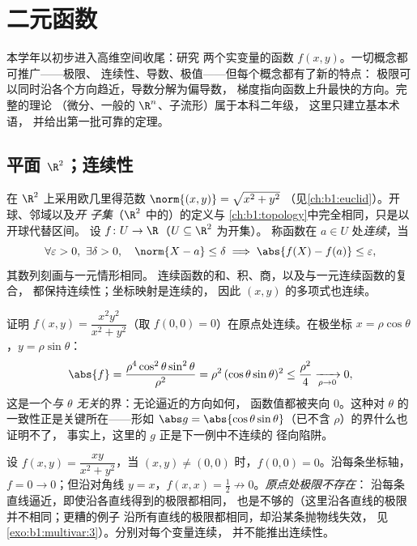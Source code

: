 \chapter{二元函数}\label{ch:b1:multivar}

本学年以初步进入高维空间收尾：研究
两个实变量的函数 $f(x, y)$。一切概念都可推广——极限、
连续性、导数、极值——但每个概念都有了新的特点：
极限可以同时沿各个方向趋近，导数分解为偏导数，
梯度指向函数上升最快的方向。完整的理论
（微分、一般的 $\R^n$、子流形）属于本科二年级，
这里只建立基本术语，
并给出第一批可靠的定理。

\section{平面 $\R^2$；连续性}

\begin{definition}\label{def:b1:multivar:topology}
在 $\R^2$ 上采用欧几里得范数 $\norm{(x,y)} = \sqrt{x^2 + y^2}$
（见\cref{ch:b1:euclid}）。开球、邻域以及\emph{开
子集}（$\R^2$ 中的）的定义与
\cref{ch:b1:topology}中完全相同，只是以开球代替区间。
设 $f \colon U \to \R$（$U \subseteq \R^2$ 为开集）。
称函数在 $a \in U$ 处\emph{连续}，当
\[
\forall\varepsilon > 0,\ \exists\delta > 0, \quad
\norm{X - a} \leq \delta \implies \abs{f(X) - f(a)} \leq
\varepsilon,
\]
其数列刻画与一元情形相同。
连续函数的和、积、商，以及与一元连续函数的复合，
都保持连续性；坐标映射是连续的，
因此 $(x,y)$ 的多项式也连续。
\end{definition}

\begin{example}
\label{ex:b1:multivar:polarbound}
证明 $f(x, y) = \dfrac{x^2y^2}{x^2 + y^2}$（取 $f(0,0) =
0$）在原点处连续。在极坐标 $x =
\rho\cos\theta$，$y = \rho\sin\theta$：
\[
\abs{f} = \frac{\rho^4\cos^2\theta\sin^2\theta}{\rho^2}
= \rho^2\,(\cos\theta\sin\theta)^2 \leq \frac{\rho^2}{4}
\xrightarrow[\rho \to 0]{} 0 ,
\]
这是一个\emph{与 $\theta$ 无关}的界：无论逼近的方向如何，
函数值都被夹向 $0$。这种对
$\theta$ 的一致性正是关键所在——形如 $\abs g =
\abs{\cos\theta\sin\theta}$（已不含 $\rho$）的界什么也证明不了，
事实上，这里的 $g$ 正是下一例中不连续的
径向陷阱。
\end{example}

\begin{example}[径向陷阱]\label{ex:b1:multivar:trap}
设 $f(x, y) = \dfrac{xy}{x^2 + y^2}$，当 $(x,y) \neq (0,0)$ 时，$f(0,
0) = 0$。沿每条坐标轴，$f = 0 \to 0$；但沿对角线 $y
= x$，$f(x, x) = \frac12 \not\to 0$。\emph{原点处极限不存在}：
沿每条直线逼近，即使沿各直线得到的极限都相同，
也是不够的（这里沿各直线的极限并不相同；更糟的例子
沿所有直线的极限都相同，却沿某条抛物线失效，
见\cref{exo:b1:multivar:3}）。分别对每个变量连续，
并不能推出连续性。
\end{example}

